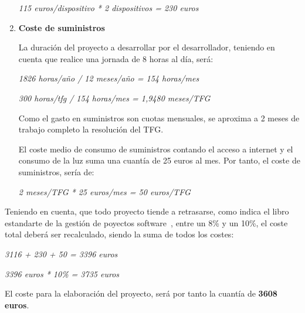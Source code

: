 \begin{enumerate}
\begin{center}
    \textit{115 euros/dispositivo * 2 dispositivos = 230 euros}
\end{center}

    \item \textbf{Coste de suministros}
    
    La duración del proyecto a desarrollar por el desarrollador, teniendo en cuenta que realice una jornada de 8 horas al día, será:
    
\begin{center}
    \textit{1826 horas/año / 12 meses/año = 154 horas/mes}
    
    \textit{300 horas/tfg / 154 horas/mes = 1,9480 meses/TFG}
\end{center}

    Como el gasto en suministros son cuotas mensuales, se aproxima a 2 meses de trabajo completo la resolución del TFG.
    
    El coste medio de consumo de suministros contando el acceso a internet y el consumo de la luz suma una cuantía de 25 euros al mes. Por tanto, el coste de suministros, sería de:
\begin{center}
    \textit{2 meses/TFG * 25 euros/mes = 50 euros/TFG}
\end{center}
    
\end{enumerate}

Teniendo en cuenta, que todo proyecto tiende a retrasarse, como indica el libro estandarte de la gestión de poyectos software~\cite{spm}, entre un 8\% y un 10\%, el coste total deberá ser recalculado, siendo la suma de todos los costes:

\begin{center}
    \textit{3116 + 230 + 50 = 3396 euros}
    
    \textit{3396 euros * 10\%  = 3735 euros}
\end{center}

El coste para la elaboración del proyecto, será por tanto la cuantía de \textbf{3608 euros}.
